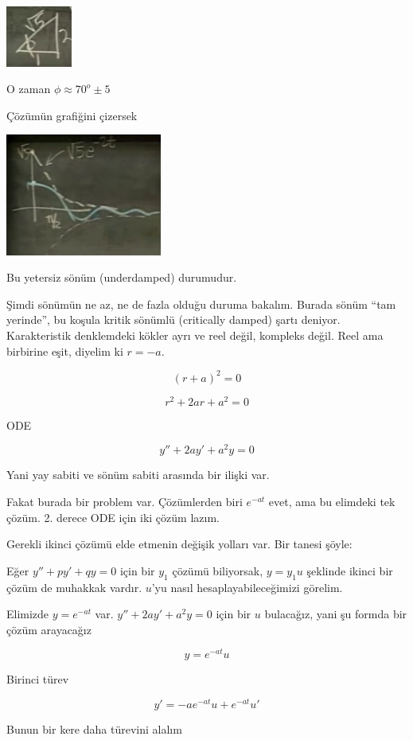\documentclass[12pt,fleqn]{article}\usepackage{../../common}
\begin{document}
\includegraphics[height=2cm]{9_3.png}

O zaman $\phi \approx 70^{o} \pm 5$

Çözümün grafiğini çizersek

\includegraphics[height=4cm]{9_4.png}

Bu yetersiz sönüm (underdamped) durumudur. 

Şimdi sönümün ne az, ne de fazla olduğu duruma bakalım. Burada sönüm ``tam
yerinde'', bu koşula kritik sönümlü (critically damped) şartı
deniyor. Karakteristik denklemdeki kökler ayrı ve reel değil, kompleks
değil. Reel ama birbirine eşit, diyelim ki $r = -a$.

$$ (r+a)^2 = 0 $$

$$ r^2 + 2ar + a^2 = 0 $$

ODE

$$ y'' + 2ay' + a^2y = 0 $$

Yani yay sabiti ve sönüm sabiti arasında bir ilişki var. 

Fakat burada bir problem var. Çözümlerden biri $e^{-at}$ evet, ama bu
elimdeki tek çözüm. 2. derece ODE için iki çözüm lazım. 

Gerekli ikinci çözümü elde etmenin değişik yolları var. Bir tanesi şöyle:

Eğer $y'' + py' + qy = 0$ için bir $y_1$ çözümü biliyorsak, $y = y_1 u$ şeklinde
ikinci bir çözüm de muhakkak vardır. $u$'yu nasıl hesaplayabileceğimizi görelim.

Elimizde $y = e^{-at}$ var. $y'' + 2ay' + a^2y = 0$ için bir $u$ bulacağız,
yani şu formda bir çözüm arayacağız

$$ y = e^{-at} u $$

Birinci türev

$$ y' = -a e^{-at}u + e^{-at} u' $$

Bunun bir kere daha türevini alalım
\end{document}
